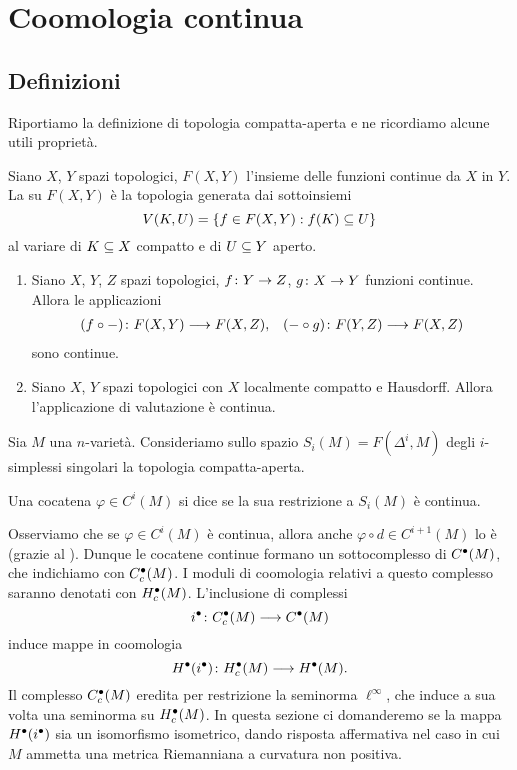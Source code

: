 \section{Coomologia continua}

\subsection{Definizioni}

Riportiamo la definizione di topologia compatta-aperta e ne ricordiamo alcune utili proprietà.

\begin{definition}
Siano $X$, $Y$ spazi topologici, $F(X,Y)$ l'insieme delle funzioni continue da $X$ in $Y$. La  su $F(X,Y)$ è la topologia generata dai sottoinsiemi
\[
V(K,U)=\{f\in F(X,Y): f(K)\subseteq U\}
\]
al variare di $K\subseteq X$ compatto e di $U\subseteq Y$ aperto.
\end{definition}

\begin{lemma}
\begin{enumerate}
\item Siano $X$, $Y$, $Z$ spazi topologici, $\map{f}{Y}{Z}$, $\map{g}{X}{Y}$ funzioni continue. Allora le applicazioni
\begin{align*}
\map{(f\circ{-})}{F(X,Y)}{F(X,Z)},&&\map{({-}\circ g)}{F(Y,Z)}{F(X,Z)}
\end{align*}
sono continue.
\item Siano $X$, $Y$ spazi topologici con $X$ localmente compatto e Hausdorff. Allora l'applicazione di valutazione
è continua.
\end{enumerate}
\end{lemma}
Sia $M$ una $n$-varietà. Consideriamo sullo spazio $S_i(M)=F(\Delta^i,M)$ degli $i$-simplessi singolari la topologia compatta-aperta.

\begin{definition}
Una cocatena $\varphi\in C^i(M)$ si dice  se la sua restrizione a $S_i(M)$ è continua.
\end{definition}

Osserviamo che se $\varphi\in C^i(M)$ è continua, allora anche $\varphi\circ d\in C^{i+1}(M)$ lo è (grazie al ). Dunque le cocatene continue formano un sottocomplesso di $C^\bullet(M)$, che indichiamo con $C^\bullet_c(M)$. I moduli di coomologia relativi a questo complesso saranno denotati con $H^\bullet_c(M)$. L'inclusione di complessi
\[
\map{i^\bul}{C^\bul_c(M)}{C^\bul(M)}
\]
induce mappe in coomologia
\[
\map{H^\bul(i^\bul)}{H^\bul_c(M)}{H^\bul(M)}.
\]
Il complesso $C^\bullet_c(M)$ eredita per restrizione la seminorma $\ell^\infty$, che induce a sua volta una seminorma su $H^\bullet_c(M)$.
In questa sezione ci domanderemo se la mappa $H^\bullet(i^\bullet)$ sia un isomorfismo isometrico, dando risposta affermativa nel caso in cui $M$ ammetta una metrica Riemanniana a curvatura non positiva.


